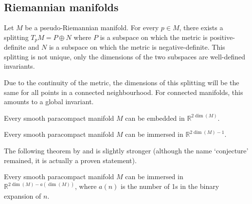 \subsection{Riemannian manifolds}


    \begin{property}
        Let $M$ be a pseudo-Riemannian manifold. For every $p\in M$, there exists a splitting $T_pM = P\oplus N$ where $P$ is a subspace on which the metric is positive-definite and $N$ is a subspace on which the metric is negative-definite. This splitting is not unique, only the dimensions of the two subspaces are well-defined invariants.
    \end{property}

    Due to the continuity of the metric, the dimensions of this splitting will be the same for all points in a connected neighbourhood. For connected manifolds, this amounts to a global invariant.

    \begin{theorem}
        Every smooth paracompact manifold $M$ can be embedded in $\mathbb{R}^{2\dim(M)}$.
    \end{theorem}
    \begin{theorem}
        Every smooth paracompact manifold $M$ can be immersed in $\mathbb{R}^{2\dim(M)-1}$.
    \end{theorem}

    The following theorem by  and  is slightly stronger (although the name `conjecture' remained, it is actually a proven statement).
    \begin{theorem}
        Every smooth paracompact manifold $M$ can be immersed in $\mathbb{R}^{2\dim(M)-a(\dim(M))}$, where $a(n)$ is the number of 1s in the binary expansion of $n$.
    \end{theorem}

